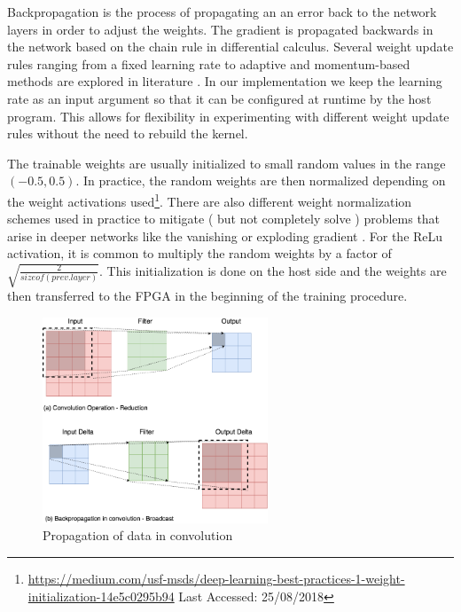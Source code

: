 Backpropagation is the process of propagating an an error back to the network layers in order to adjust the weights. The gradient is propagated backwards in the network based on the chain rule in differential calculus. Several weight update rules ranging from a fixed learning rate to adaptive and momentum-based methods are explored in literature \cite{ddl}. In our implementation we keep the learning rate as an input argument so that it can be configured at runtime by the host program. This allows for flexibility in experimenting with different weight update rules without the need to rebuild the kernel.

The trainable weights are usually initialized to small random values in the range $ (-0.5,0.5) $. In practice, the random weights are then normalized depending on the weight activations used\footnote{\url{https://medium.com/usf-msds/deep-learning-best-practices-1-weight-initialization-14e5c0295b94} Last Accessed: 25/08/2018}. There are also different weight normalization schemes used in practice to mitigate ( but not completely solve ) problems that arise in deeper networks like the vanishing or exploding gradient \cite{hochreiter1998vanishing}. For the ReLu activation, it is common to multiply the random weights by a factor of $ \sqrt{\frac{2}{sizeof(prev. layer)}} $. This initialization is done on the host side and the weights are then transferred to the FPGA in the beginning of the training procedure. 


\begin{figure}[h]
\centering
\includegraphics[width=0.6\textwidth]{Figures/convprop}
\caption[comm]{ Propagation of data in convolution }
\decoRule
\label{fig:conv}
\end{figure}

